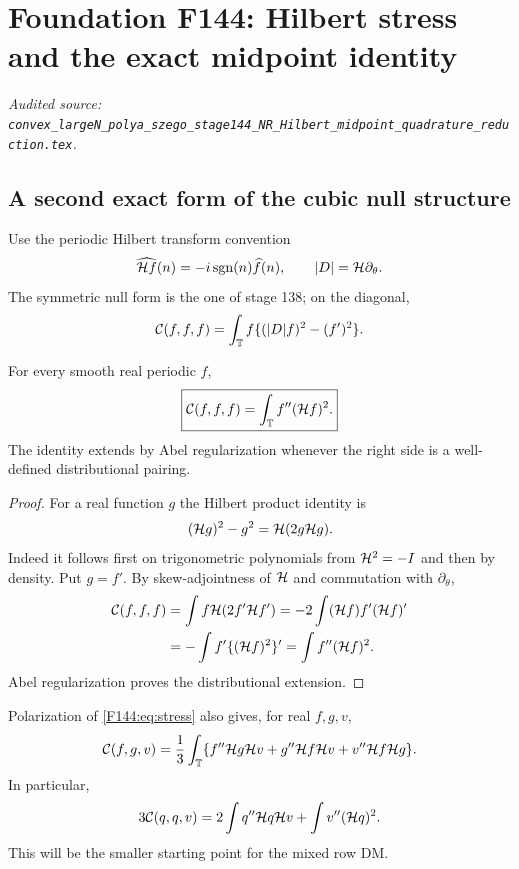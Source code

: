 \begingroup
\section{Foundation F144: Hilbert stress and the exact midpoint identity}
\label{module:F144}
\noindent\textit{Audited source: \nolinkurl{convex_largeN_polya_szego_stage144_NR_Hilbert_midpoint_quadrature_reduction.tex}.}
\subsection{A second exact form of the cubic null structure}

Use the periodic Hilbert transform convention
\begin{equation}\label{F144:eq:H}
 \widehat{\mathcal H f}(n)=-i\operatorname {sgn}(n)\widehat f(n),
 \qquad |D|=\mathcal H\partial_\theta.
\end{equation}
The symmetric null form is the one of stage 138; on the diagonal,
\begin{equation}\label{F144:eq:C}
 \mathcal C(f,f,f)=\int_\mathbb T f\{(|D|f)^2-(f')^2\}.
\end{equation}

\begin{lemma}
\label{F144:lem:stress}
For every smooth real periodic $f$,
\begin{equation}\label{F144:eq:stress}
 \boxed{\mathcal C(f,f,f)=\int_\mathbb T f''(\mathcal H f)^2.}
\end{equation}
The identity extends by Abel regularization whenever the right side is a
well-defined distributional pairing.
\end{lemma}

\begin{proof}
For a real function $g$ the Hilbert product identity is
\begin{equation}\label{F144:eq:product}
 (\mathcal H g)^2-g^2=\mathcal H(2g\mathcal H g).
\end{equation}
Indeed it follows first on trigonometric polynomials from
$\mathcal H^2=-I$ and then by density.  Put $g=f'$.  By skew-adjointness of
$\mathcal H$ and commutation with $\partial_\theta$,
\begin{align*}
 \mathcal C(f,f,f)
 &=\int f\mathcal H(2f'\mathcal H f')
 =-2\int (\mathcal H f)f'(\mathcal H f)'\\
 &=-\int f'\{(\mathcal H f)^2\}'
 =\int f''(\mathcal H f)^2.
\end{align*}
Abel regularization proves the distributional extension.
\end{proof}

Polarization of \eqref{F144:eq:stress} also gives, for real $f,g,v$,
\begin{equation}\label{F144:eq:polarized-stress}
 \mathcal C(f,g,v)=\frac13\int_\mathbb T
 \{f''\mathcal H g\mathcal H v+g''\mathcal H f\mathcal H v+v''\mathcal H f\mathcal H g\}.
\end{equation}
In particular,
\begin{equation}\label{F144:eq:q-q-v}
 3\mathcal C(q,q,v)
 =2\int q''\mathcal H q\mathcal H v+\int v''(\mathcal H q)^2.
\end{equation}
This will be the smaller starting point for the mixed row DM.

